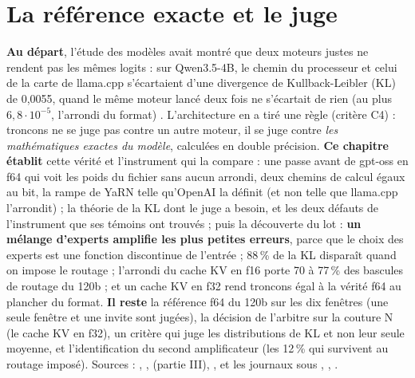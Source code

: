 \ifdefined\GrapheRefRampe\else\fi

\chapter{La référence exacte et le juge}\label{ch:t2-reference}

\begin{origine}
\textbf{Au départ}, l'étude des modèles avait montré que deux moteurs justes ne rendent pas les mêmes logits : sur Qwen3.5-4B, le chemin du processeur et celui de la carte de llama.cpp s'écartaient d'une divergence de Kullback-Leibler (KL) de 0,0055, quand le même moteur lancé deux fois ne s'écartait de rien (au plus $6{,}8\cdot10^{-5}$, l'arrondi du format) \mes. L'architecture en a tiré une règle (critère C4) : troncons ne se juge pas contre un autre moteur, il se juge contre \emph{les mathématiques exactes du modèle}, calculées en double précision.
\textbf{Ce chapitre établit} cette vérité et l'instrument qui la compare : une passe avant de gpt-oss en f64 qui voit les poids du fichier sans aucun arrondi, deux chemins de calcul égaux au bit, la rampe de YaRN telle qu'OpenAI la définit (et non telle que llama.cpp l'arrondit) ; la théorie de la KL dont le juge a besoin, et les deux défauts de l'instrument que ses témoins ont trouvés ; puis la découverte du lot : \textbf{un mélange d'experts amplifie les plus petites erreurs}, parce que le choix des experts est une fonction discontinue de l'entrée ; 88\,\% de la KL disparaît quand on impose le routage ; l'arrondi du cache KV en f16 porte 70 à 77\,\% des bascules de routage du 120b ; et un cache KV en f32 rend troncons égal à la vérité f64 au plancher du format.
\textbf{Il reste} la référence f64 du 120b sur les dix fenêtres (une seule fenêtre et une invite sont jugées), la décision de l'arbitre sur la couture N (le cache KV en f32), un critère qui juge les distributions de KL et non leur seule moyenne, et l'identification du second amplificateur (les 12\,\% qui survivent au routage imposé).
Sources : , ,  (partie III), , et les journaux sous , , .
\end{origine}


